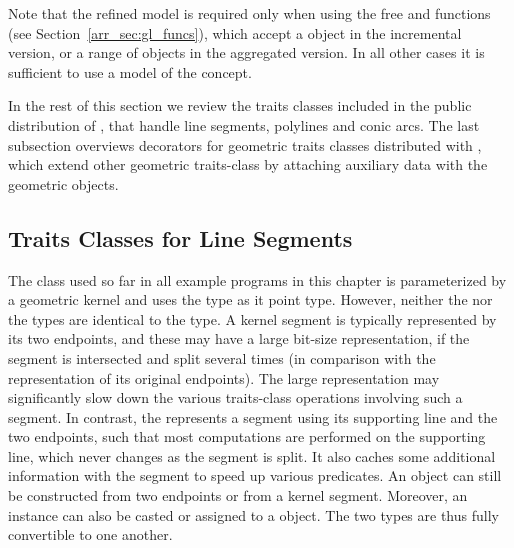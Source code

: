Note that the refined model  is required
only when using the free  and
 functions (see Section~\ref{arr_sec:gl_funcs}),
which accept a  object in the incremental version,
or a range of  objects in the aggregated version.
In all other cases it is sufficient to use a model of the
 concept.

In the rest of this section we review the traits classes
included in the public distribution of \cgal, that handle line
segments, polylines and conic arcs. The last subsection overviews
decorators for geometric traits classes distributed with \cgal,
which extend other geometric traits-class by attaching auxiliary
data with the geometric objects.

\subsection{Traits Classes for Line Segments}
\label{arr_ssec:tr_segs}

The  class used so far
in all example programs in this chapter is parameterized by a
geometric kernel and uses the  type as it
point type. However, neither the  nor the
 types are identical to the
 type. A kernel segment is typically
represented by its two endpoints, and these may have a large bit-size
representation, if the segment is intersected and split several
times (in comparison with the representation of its original
endpoints). The large representation may significantly slow down the
various traits-class operations involving such a segment. In contrast,
the  represents a segment using
its supporting line and the two endpoints, such that most computations
are performed on the supporting line, which never changes as the
segment is split. It also caches some additional information with
the segment to speed up various predicates.
An  object can still be constructed from two
endpoints or from a kernel segment. Moreover, an
 instance can also be casted or assigned to a
 object. The two types are thus fully
convertible to one another.

